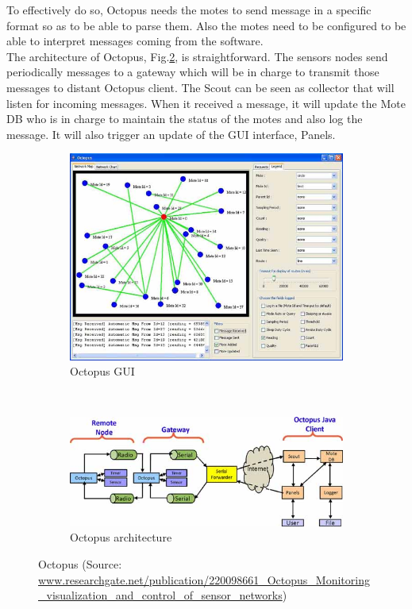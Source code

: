 To effectively do so, Octopus needs the motes to send message in a specific format so as to be able to parse them. Also the motes need to be configured to be able to interpret messages coming from the software.\\

The architecture of Octopus, Fig.\ref{fig:octopus_archi}, is straightforward. The sensors nodes send periodically messages to a gateway which will be in charge to transmit those messages to distant Octopus client. The Scout can be seen as collector that will listen for incoming messages. When it received a message, it will update the Mote DB who is in charge to maintain the status of the motes and also log the message. It will also trigger an update of the GUI interface, Panels. \\

\begin{figure}
    \centering
    \begin{subfigure}[b]{0.5\textwidth}
      \includegraphics[width=\textwidth]{res/octopus.png}
      \caption{Octopus GUI}
      \label{fig:octopus_gui}
    \end{subfigure}
    ~
    \begin{subfigure}[b]{0.5\textwidth}
        \includegraphics[width=\textwidth]{res/octopus_archi.png}
        \caption{Octopus architecture}
        \label{fig:octopus_archi}
    \end{subfigure}
    \caption{Octopus (Source: \url{www.researchgate.net/publication/220098661_Octopus_Monitoring_visualization_and_control_of_sensor_networks})}
    \label{fig:octopus}
\end{figure}


